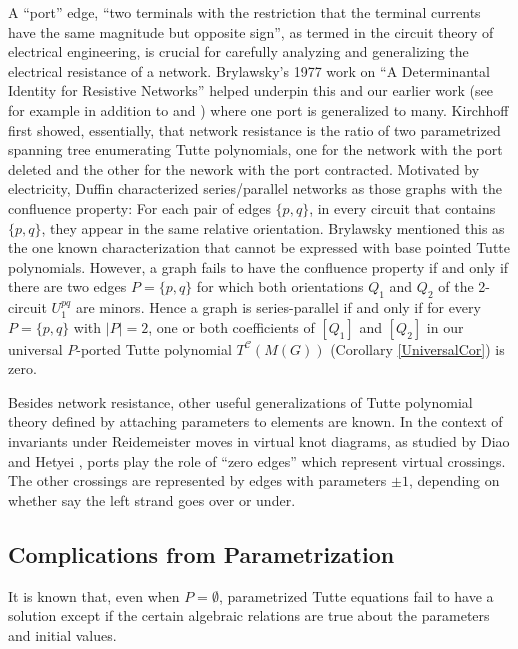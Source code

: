\documentclass[12pt,leqno]{amsart}
\theoremstyle{remark}
\newcommand{\Card}[1]{\ensuremath{{\left|#1\right|}}}
\begin{document}
A ``port'' edge, ``two terminals with the restriction
that the terminal currents have the same magnitude but
opposite sign''\cite{CRCHandbookPorts}, as termed 
in the circuit theory 
of electrical engineering,
is crucial for carefully analyzing and generalizing the
electrical resistance of a network.
Brylawsky's
1977 work on ``A Determinantal Identity for Resistive Networks''
\cite{BryDetIdResistive} helped underpin this and
our earlier work (see for example \cite{sdcOMP} in addition to
\cite{sdcPorted} and \cite{TutteEx}) where one port is
generalized to many.  Kirchhoff first showed, 
essentially, that network resistance is 
the ratio of two parametrized spanning tree enumerating
Tutte polynomials, one for the network with the port
deleted and the other for the nework with the port contracted.
Motivated by electricity,
Duffin\cite{DuffinSP} characterized series/parallel networks
as those graphs with the confluence property: For each
pair of edges $\{p,q\}$, in every circuit that contains
$\{p,q\}$, they appear in the same relative orientation.
Brylawsky\cite{BrylawskiPointed} mentioned this as
the one known characterization 
that cannot be expressed with base pointed Tutte polynomials.  However,
a graph fails to have the confluence property
if and only if there are two edges $P=\{p,q\}$ for which
both orientations $Q_1$ and $Q_2$ of the 2-circuit $U^{pq}_1$ are 
minors.
Hence a graph is series-parallel if and only if
for every $P=\{p,q\}$ with $\Card{P}=2$, one or both
coefficients of $[Q_1]$ and $[Q_2]$ in our
universal $P$-ported Tutte polynomial $T^{\mathcal{C}}(M(G))$
(Corollary \ref{UniversalCor})
is zero.  

Besides network resistance, other
useful generalizations of Tutte polynomial
theory defined by attaching parameters 
to elements are 
known\cite{Ellis-Monaghan-Traldi,Ellis-Monaghan-Merino-2}.
In the context of invariants under Reidemeister
moves in virtual knot diagrams\cite{KauffmanVirtualKnots}, 
as studied by Diao and Hetyei \cite{RelTuttePoly}, ports play the
role of ``zero edges'' which represent virtual crossings.
The other crossings are represented by edges with 
parameters $\pm 1$, depending on whether say the
left strand goes over or under.  

\subsection{Complications from Parametrization}
\label{Complications}
It is known that,  even when $P=\emptyset$,
parametrized Tutte equations fail to have a solution
except if the certain algebraic relations are true 
about the parameters and
initial values.
\end{document}
